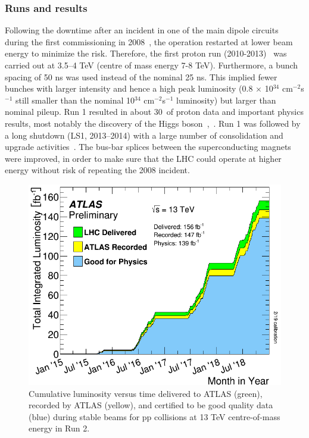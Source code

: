 	\subsubsection{Runs and results}
	\label{sec:runs and results}
	Following the downtime after an incident in one of the main dipole circuits 
	during the first commissioning in 2008~\cite{lebrun2009report},
	the operation restarted at lower beam energy to minimize the risk. 
	Therefore, the first proton run (2010-2013)~\cite{alemany2013operation} was
	carried out at 3.5–4 TeV (centre of mass energy 7-8 TeV). Furthermore, a bunch spacing
	of 50 ns was used instead of the nominal 25 ns. 
	This implied fewer bunches with larger intensity and hence a 
	high peak luminosity (0.8 $\times$ 10$^{34}$ cm$^{-2}$s$^{-1}$ still smaller than
	the nominal 10$^{34}$ cm$^{-2}$s$^{-1}$ luminosity) but larger than nominal pileup. 
	Run 1 resulted in about 30~\fb of proton data and important physics results,
	most notably the discovery of the Higgs boson~\cite{HIGG-2012-27},~\cite{HIGG-2012-28}.
	Run 1 was followed by a long shutdown (LS1, 2013–2014)
	with a large number of consolidation and upgrade activities~\cite{bordry2013first}. 	
	The bus-bar splices between the superconducting magnets were improved, 
	in order to make sure that the LHC could operate at higher energy 
	without risk of repeating the 2008 incident. 

	\begin{figure}[bht]
		\begin{centering}	
		\includegraphics[width=.4\textwidth]{Detector_plots/Run2_lumi.png}
		\caption{Cumulative luminosity versus time delivered to 
		ATLAS (green), recorded by ATLAS (yellow), and certified to be 
		good quality data (blue) during stable beams for pp collisions 
		at 13 TeV centre-of-mass energy in Run 2. 
			}
		\label{fig:Run2_lumi}
		\end{centering}
	\end{figure}
	

